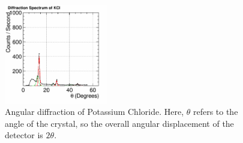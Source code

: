\documentclass[%
 reprint,
 amsmath,amssymb,
 aps,
 pra,
]{revtex4-1}
\begin{document}
\begin{figure}[H]
	\centering
	\includegraphics[width=0.4\textwidth]{Diffraction_KCl.png}
	\caption{Angular diffraction of Potassium Chloride. Here, $\theta$ refers to the angle of the crystal, so the overall angular displacement of the detector is $2 \theta$.}
	\label{fig:KCl}
\end{figure}
\end{document}
